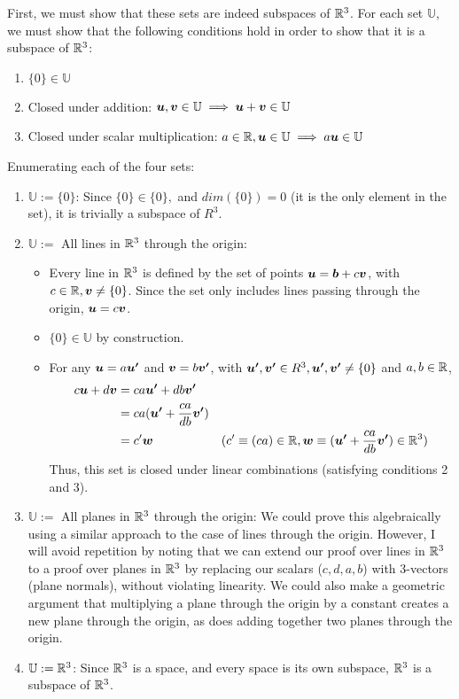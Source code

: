 \documentclass[twoside,10pt]{article}
\newcommand{\aln}[1]{\begin{align}#1\end{align}}
\begin{document}
First, we must show that these sets are indeed subspaces of $\mathbb{R}^3$.
For each set $\mathbb{U}$, we must show that the following conditions hold in order to show that it is a subspace of $\mathbb{R}^3$:

\begin{enumerate}
\item $\{0\} \in \mathbb{U}$
\item Closed under addition: $\bm{u}, \bm{v} \in \mathbb{U} \implies \bm{u} + \bm{v} \in \mathbb{U}$
\item Closed under scalar multiplication: $a \in \mathbb{R}, \bm{u} \in \mathbb{U} \implies a\bm{u} \in \mathbb{U}$
\end{enumerate}

Enumerating each of the four sets:
\begin{enumerate}
  \item $\mathbb{U} := \{0\}$: Since $\{0\} \in \{0\},$ and $dim(\{0\}) = 0$ (it is the only element in the set), it is trivially a subspace of $R^3$.
  \item $\mathbb{U} := $ All lines in $\mathbb{R}^3$ through the origin:
  \begin{itemize}
    \item Every line in $\mathbb{R}^3$ is defined by the set of points $\bm{u} = \bm{b} + c\bm{v}$, with $c \in \mathbb{R}, \bm{v} \neq \{0\}$.
    Since the set only includes lines passing through the origin, $\bm{u} = c\bm{v}$.
    \item $\{0\} \in \mathbb{U}$ by construction.
    \item For any $\bm{u} = a\bm{u'}$ and $\bm{v} = b\bm{v'}$, with $\bm{u'}, \bm{v'} \in R^3, \bm{u'}, \bm{v'} \neq \{0\}$ and $a,b \in \mathbb{R}$,
    \aln{
      c\vct{u} + d\vct{v} &= ca\vct{u'} + db\vct{v'}\\
      &= ca(\vct{u'} + \frac{ca}{db}\vct{v'})\\
      &= c'\vct{w} &(c' \equiv (ca) \in \R, \vct{w} \equiv (\vct{u'} + \frac{ca}{db}\vct{v'}) \in \R^3)
    }
    Thus, this set is closed under linear combinations (satisfying conditions 2 and 3). 
  \end{itemize}
  \item $\mathbb{U} := $ All planes in $\mathbb{R}^3$ through the origin: We could prove this algebraically using a similar approach to the case of lines through the origin.
    However, I will avoid repetition by noting that we can extend our proof over lines in $\mathbb{R}^3$ to a proof over planes in $\mathbb{R}^3$ by replacing our scalars ($c, d, a, b$) with 3-vectors (plane normals), without violating linearity.
    We could also make a geometric argument that multiplying a plane through the origin by a constant creates a new plane through the origin, as does adding together two planes through the origin.
  \item $\mathbb{U} := \mathbb{R}^3$: Since $\mathbb{R}^3$ is a space, and every space is its own subspace, $\mathbb{R}^3$ is a subspace of $\mathbb{R}^3$.
\end{enumerate}
\end{document}

